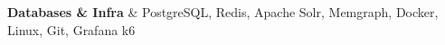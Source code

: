 \textbf{Databases \& Infra} & PostgreSQL, Redis, Apache Solr, Memgraph, Docker, Linux, Git, Grafana k6 \\
